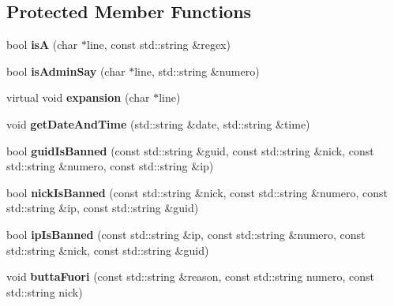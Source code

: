 \subsection*{Protected Member Functions}
\begin{DoxyCompactItemize}
\item 
\hypertarget{class_analyzer_af540d4ed379d6d5ccb9fb5c09eb91cba}{
bool {\bfseries isA} (char $\ast$line, const std::string \&regex)}
\label{class_analyzer_af540d4ed379d6d5ccb9fb5c09eb91cba}

\item 
\hypertarget{class_analyzer_a2abbf918a260ba0438784e5c2334afc9}{
bool {\bfseries isAdminSay} (char $\ast$line, std::string \&numero)}
\label{class_analyzer_a2abbf918a260ba0438784e5c2334afc9}

\item 
\hypertarget{class_analyzer_ade91189324261f9c22d94566e2dc9dba}{
virtual void {\bfseries expansion} (char $\ast$line)}
\label{class_analyzer_ade91189324261f9c22d94566e2dc9dba}

\item 
\hypertarget{class_analyzer_a53fba3038f055d758a761bf6381d1fed}{
void {\bfseries getDateAndTime} (std::string \&date, std::string \&time)}
\label{class_analyzer_a53fba3038f055d758a761bf6381d1fed}

\item 
\hypertarget{class_analyzer_a93a54b992d65966bfcad35288d602c87}{
bool {\bfseries guidIsBanned} (const std::string \&guid, const std::string \&nick, const std::string \&numero, const std::string \&ip)}
\label{class_analyzer_a93a54b992d65966bfcad35288d602c87}

\item 
\hypertarget{class_analyzer_a97e40f95b27b0f78a5ba46c55337b718}{
bool {\bfseries nickIsBanned} (const std::string \&nick, const std::string \&numero, const std::string \&ip, const std::string \&guid)}
\label{class_analyzer_a97e40f95b27b0f78a5ba46c55337b718}

\item 
\hypertarget{class_analyzer_a99c40e4eeaf3bb952c3180a18f5f238f}{
bool {\bfseries ipIsBanned} (const std::string \&ip, const std::string \&numero, const std::string \&nick, const std::string \&guid)}
\label{class_analyzer_a99c40e4eeaf3bb952c3180a18f5f238f}

\item 
\hypertarget{class_analyzer_a7051ff43e8078a7bd7bc5c3bcf08ec90}{
void {\bfseries buttaFuori} (const std::string \&reason, const std::string numero, const std::string nick)}
\label{class_analyzer_a7051ff43e8078a7bd7bc5c3bcf08ec90}


\end{DoxyCompactItemize}
